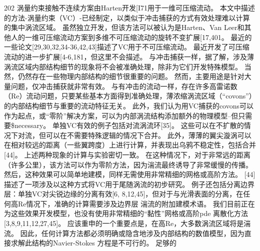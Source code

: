 \documentclass[UTF8,11pt,a4paper,openany,fontset=fandol]{ctexbook}
\begin{document}
202 涡量约束接触不连续方案由Harten开发[I71用于一维可压缩流动。 本文中描述的方法-涡量约束（VC）-已经制定，以类似于冲击捕获的方式有效处理难以计算的集中涡流区域。 虽然独立开发，但该方法可以被认为是Harten、Van Leer和其他人的一维可压缩流动方案到多维不可压缩流动的旋转不变扩展[17,401。 最近的一些论文[29,30,32,34-36,42,43]描述了VC用于不可压缩流动。 最近开发了可压缩流动的进一步扩展[4-6,181，但这里不会描述。 与冲击捕获一样，据了解，涉及薄涡流区域内部结构细节的现象将不会被准确处理，除非为它们开发特殊模型。 当然，仍然存在一些物理内部结构的细节很重要的问题。 然而，主要用途是针对大量问题，仅冲击捕获就非常有效。 与有冲击的流动一样，存在许多高雷诺数（Re）流动问题，只要某些基本方面得到准确处理，薄浓缩涡流区域（“covons”）的内部结构细节与重要的流动特征无关。 此外，我们认为用VC捕获的covons可以作为起点，或“零阶”解决方案，可以为内部涡流结构添加额外的物理模型--但只需要\$necessary。 单独VC有效的例子包括对流涡流环[35]。 这些可以在不扩散的情况下对流，但可以在不需要特殊逻辑的情况下合并。 此外，薄薄的翼尖漩涡可以在相对较远的距离（一些翼跨度）上进行计算，并表现出乌鸦不稳定性，包括合并[44]。 上述两种现象的计算与实验密切一致。 在这种情况下，对于非常远的距离（许多公里），该方法可以作为零阶方法，因为湍流最终诱导了非常缓慢的传播。 然后，这种效果可以简单地建模，同样无需使用非常精细的网格或高阶方法。 [44]描述了一项涉及以这种方式将VC用于尾随涡流的初步研究。 例子还包括分离边界层：单独VC对尖锐边缘的分离有效[6, 8,12,45]，但对于与光滑表面的分离，在任何高Re情况下，准确的计算需要涉及边界层 湍流的附加建模术语。 我们目前正在为这些效果开发模型，也没有使用非常精细的“黏性”网格或高阶pde 离散化方法[3,8,9,11,12,27,45]。 应该重申的一个重要点是，在高Re，大多数涡流区域将是湍流。 因此，任何计算方法都必须明确或隐含地涉及内部结构的数值模型，因为直接求解此结构的Navier-Stokes 方程是不可行的。 足够的
\end{document}
